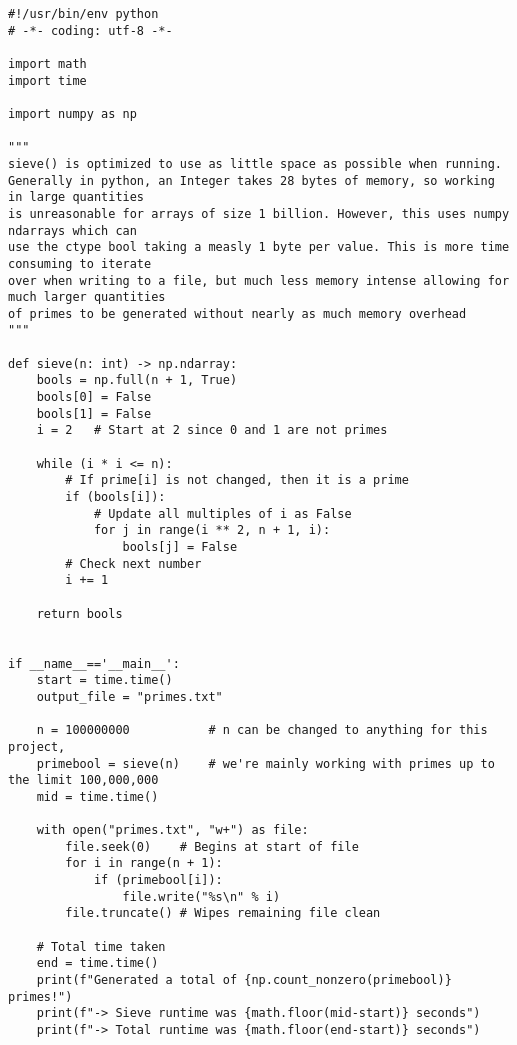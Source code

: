 \documentclass[11pt]{article}
\begin{document}
    \lstset{style=EddiePythonStyle}
    \begin{lstlisting}
#!/usr/bin/env python
# -*- coding: utf-8 -*-

import math
import time

import numpy as np

"""
sieve() is optimized to use as little space as possible when running.
Generally in python, an Integer takes 28 bytes of memory, so working in large quantities
is unreasonable for arrays of size 1 billion. However, this uses numpy ndarrays which can
use the ctype bool taking a measly 1 byte per value. This is more time consuming to iterate
over when writing to a file, but much less memory intense allowing for much larger quantities
of primes to be generated without nearly as much memory overhead
"""

def sieve(n: int) -> np.ndarray:
    bools = np.full(n + 1, True)
    bools[0] = False
    bools[1] = False
    i = 2   # Start at 2 since 0 and 1 are not primes

    while (i * i <= n):
        # If prime[i] is not changed, then it is a prime
        if (bools[i]):
            # Update all multiples of i as False
            for j in range(i ** 2, n + 1, i):
                bools[j] = False
        # Check next number
        i += 1

    return bools


if __name__=='__main__':
    start = time.time()
    output_file = "primes.txt"

    n = 100000000           # n can be changed to anything for this project,
    primebool = sieve(n)    # we're mainly working with primes up to the limit 100,000,000
    mid = time.time()

    with open("primes.txt", "w+") as file:
        file.seek(0)    # Begins at start of file
        for i in range(n + 1):
            if (primebool[i]):
                file.write("%s\n" % i)
        file.truncate() # Wipes remaining file clean

    # Total time taken
    end = time.time()
    print(f"Generated a total of {np.count_nonzero(primebool)} primes!")
    print(f"-> Sieve runtime was {math.floor(mid-start)} seconds")
    print(f"-> Total runtime was {math.floor(end-start)} seconds")
    \end{lstlisting}
\end{document}
